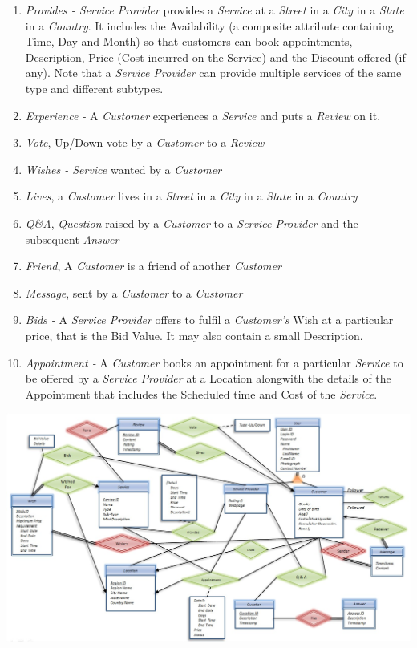 \documentclass[a4paper]{article}
\begin{document}
\begin{enumerate}
\item \textit{Provides - Service Provider} provides a \textit{Service} at a \textit{Street} in a \textit{City} in a \textit{State} in a \textit{Country}. It includes the Availability (a composite attribute containing Time, Day and Month) so that customers can book appointments, Description, Price (Cost incurred on the Service) and the Discount offered (if any). Note that a \textit{Service Provider} can provide multiple services of the same type and different subtypes.

\item \textit{Experience -} A \textit{Customer} experiences a \textit{Service} and puts a \textit{Review} on it.

\item \textit{Vote}, Up/Down vote by a \textit{Customer} to a \textit{Review}
\item \textit{Wishes - Service} wanted by a \textit{Customer}

\item \textit{Lives}, a \textit{Customer} lives in a \textit{Street} in a \textit{City} in a \textit{State} in a \textit{Country}
\item \textit{Q\&A}, \textit{Question} raised by a \textit{Customer} to a \textit{Service Provider} and the subsequent \textit{Answer}
\item \textit{Friend}, A \textit{Customer} is a friend of another \textit{Customer}
\item \textit{Message}, sent by a \textit{Customer} to a \textit{Customer}
\item \textit{Bids -} A \textit{Service Provider} offers to fulfil a \textit{Customer's} Wish at a particular price, that is the Bid Value. It may also contain a small Description.
\item \textit{Appointment -} A \textit{Customer} books an appointment for a particular \textit{Service} to be offered by a \textit{Service Provider} at a Location alongwith the details of the Appointment that includes the Scheduled time and Cost of the \textit{Service}.
\end{enumerate}


\includegraphics[width=160mm]{ermodel.jpg}
\end{document}
